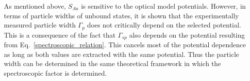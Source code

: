  As  mentioned above, $S_{Aa}$ is sensitive to the optical model potentials. However, in terms of particle widths of unbound states, it is shown that the experimentally measured particle width $\Gamma_p$ does not critically depend on the selected potential. This is a consequence of the fact that $\Gamma_{sp}$ also depends on the potential resulting from Eq.~\ref{spectroscopic_relation}. This cancels most of the potential dependence as long as both values are extracted with the same potential.  Thus the particle width can be determined in the same theoretical framework in which the spectroscopic factor is determined.








